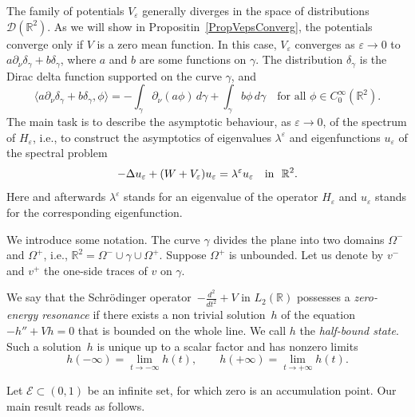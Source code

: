 \documentclass[reqno]{amsart}
\theoremstyle{plain}
\numberwithin{equation}{section}
\newcommand{\Real}{\mathbb R}
\newcommand{\eps}{\varepsilon}
\newcommand{\cE}{\mathcal{E}}
\renewcommand{\emph}[1]{{\textit{#1}}}
\newcommand{\npt}{\partial_\nu}
\begin{document}
The family of potentials $V_\eps$ generally diverges in the space of distributions $\mathcal{D}(\Real^2)$.
As we will show  in Propositin~\ref{PropVepsConverg},
the  potentials converge only if $V$ is a zero mean function. In this case,
$V_\eps$ converges as $\eps\to 0$ to $a\partial_\nu\delta_\gamma+b\delta_\gamma$, where $a$ and $b$ are some functions on $\gamma$. The  distribution $\delta_\gamma$ is the Dirac delta function supported on the curve $\gamma$, and
\begin{equation*}
  \langle a\partial_\nu\delta_\gamma+b \delta_\gamma, \phi \rangle= -\int_\gamma  \npt(a\phi)\,d\gamma+\int_\gamma b \phi\,d\gamma\quad\text{for all }\phi\in C^\infty_0(\Real^2).
\end{equation*}
The main task is to describe the  asymptotic behaviour, as $\eps\to 0$, of the spectrum  of $H_\eps$, i.e., to construct the asymptotics of eigenvalues $\lambda^\eps$ and eigenfunctions $u_\eps$ of the spectral problem
\begin{equation}\label{SpectralEqn}
-\Delta u_\eps +(W+V_\eps) u_\eps= \lambda^\eps u_\eps\quad \hbox{in \ } \Real^2.
\end{equation}
Here and afterwards $\lambda^\eps$ stands for an eigenvalue of the operator $H_\eps$ and $u_\eps$ stands for the corresponding eigenfunction.




We  introduce some notation. The curve $\gamma$ divides the plane into two domains $\Omega^-$ and $\Omega^+$, i.e., $\Real^2=\Omega^-\cup\gamma\cup\Omega^+$. Suppose  $\Omega^+$ is unbounded.
Let us denote by $v^-$ and $v^+$ the one-side traces of $v$ on $\gamma$.

We  say that the Schr\"odinger operator~$-\frac{d^2}{d t^2}+V$ in $L_2(\Real)$ possesses a \emph{zero-energy resonance}  if there exists a non trivial solution~$h$ of the equation $-h'' +Vh= 0$ that is bounded on the whole line.  We call $h$ the \emph{half-bound state}.  Such a solution~$h$ is  unique up to a scalar factor and has nonzero limits
\begin{equation*}
  h(-\infty)=\lim\limits_{t\to-\infty}h(t), \qquad
  h(+\infty)=\lim\limits_{t\to+\infty}h(t).
\end{equation*}

Let $\cE\subset(0, 1)$ be an infinite set, for which zero is an accumulation point.
Our main result reads as follows.
\end{document}
